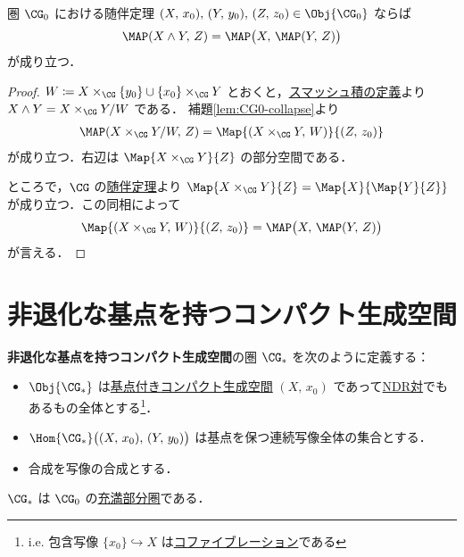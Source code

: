 \documentclass[algtopo_main]{subfiles}
\begin{document}
\begin{mytheo}[label=thm:CG0-adjoint]{圏 $\CG_0$ における随伴定理}
    $(X,\, x_0),\, (Y,\, y_0),\, (Z,\, z_0) \in \Obj{\CG_0}$ ならば
    \begin{align}
        \MAP(X \wedge Y,\, Z) = \MAP\bigl(X,\, \MAP(Y,\, Z)\bigr)
    \end{align}
    が成り立つ．
\end{mytheo}

\begin{proof}
    $W \coloneqq X \times_{\CG} \{y_0\} \cup \{x_0\} \times_{\CG} Y$ とおくと，\hyperref[def:smash-re]{スマッシュ積の定義}より $X \wedge Y = X \times_{\CG}Y/W$ である．
    補題\ref{lem:CG0-collapse}より
    \begin{align}
        \MAP (X \times_{\CG} Y/W,\, Z) = \Map{(X \times_{\CG} Y,\, W)}{(Z,\, z_0)}
    \end{align}
    が成り立つ．右辺は $\Map{X \times_{\CG} Y}{Z}$ の部分空間である．

    ところで，$\CG$ の\hyperref[thm:CG-adjoint]{随伴定理}より $\Map{X \times_{\CG} Y}{Z} = \Map{X}{\Map{Y}{Z}}$ が成り立つ．この同相によって
    \begin{align}
        \Map{(X \times_{\CG} Y,\, W)}{(Z,\, z_0)} = \MAP \bigl( X,\, \MAP (Y,\, Z) \bigr) 
    \end{align}
    が言える．
\end{proof}


\section{非退化な基点を持つコンパクト生成空間}

\textbf{非退化な基点を持つコンパクト生成空間}の圏 $\CG_*$ を次のように定義する：
\begin{itemize}
    \item $\Obj{\CG_*}$ は\hyperref[def:bases-space]{基点付き}\hyperref[def:CG]{コンパクト生成空間} $(X,\, x_0)$ であって\hyperref[def:NDR]{NDR対}でもあるもの全体とする\footnote{i.e. 包含写像 $\{x_0\} \hookrightarrow X$ は\hyperref[def:cofibration]{コファイブレーション}である}．
    \item $\Hom{\CG_*} \bigl( (X,\, x_0),\, (Y,\, y_0) \bigr)$ は基点を保つ連続写像全体の集合とする．
    \item 合成を写像の合成とする．
\end{itemize}
$\CG_*$ は $\CG_0$ の\hyperref[def:fullsub]{充満部分圏}である．
\end{document}
